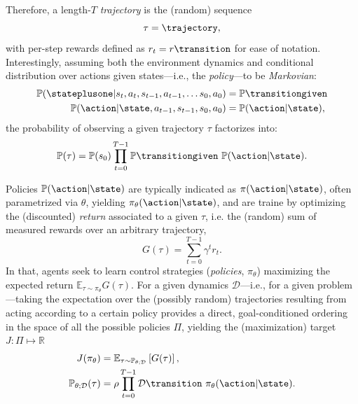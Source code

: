 Therefore, a length-\(T\) \emph{trajectory} is the (random) sequence
\begin{equation}\label{eq:trajectory_definition}
    \tau = \trajectory,
\end{equation}
with per-step rewards defined as \(r_t = r \transition \) for ease of notation.
Interestingly, assuming both the environment dynamics and conditional distribution over actions given states---i.e., the \emph{policy}---to be \emph{Markovian}:
%
\begin{align}
\mathbb P(\stateplusone \vert s_t, a_t, s_{t-1}, a_{t-1}, \dots s_0, a_0 ) &= \mathbb P \transitiongiven \label{eq:dynamics_markovian} \\
\mathbb P(\action \vert \state, a_{t-1}, s_{t-1}, s_0, a_0) &= \mathbb P(\action \vert \state), \label{eq:policy_markovian}
\end{align}
%
the probability of observing a given trajectory \( \tau \) factorizes into:
\begin{equation}\label{eq:traj_prob}
    \mathbb P(\tau) = \mathbb P (s_0) \prod_{t=0}^{T-1} \mathbb P \transitiongiven \ \mathbb P(\action \vert \state).
\end{equation}

Policies \( \mathbb P(\action \vert \state) \) are typically indicated as \( \pi(\action \vert \state) \), often parametrized via \( \theta \), yielding \( \pi_\theta (\action \vert \state )\), and are traine by optimizing the (discounted) \emph{return} associated to a given \( \tau \), i.e. the (random) sum of measured rewards over an arbitrary trajectory, 
\[
    G(\tau) = \sum_{t=0}^{T-1} \gamma^{t} r_t.
\]
In that, agents seek to learn control strategies (\emph{policies}, \( \pi_\theta \)) maximizing the expected return \( \mathbb E_{\tau \sim \pi_\theta} G(\tau) \). 
For a given dynamics \( \mathcal D \)---i.e., for a given problem---taking the expectation over the (possibly random) trajectories resulting from acting according to a certain policy provides a direct, goal-conditioned ordering in the space of all the possible policies \( \Pi \), yielding the (maximization) target \( J : \Pi \mapsto \mathbb R \)
\begin{align}
    J(\pi_\theta) &= \mathbb E_{\tau \sim \mathbb P_{\theta; \mathcal D}} \left[ G(\tau) \right], \label{eq:RL-j-function} \\
    \mathbb P_{\theta; \mathcal D} (\tau) &= \rho \prod_{t=0}^{T-1} \mathcal D \transition \ \pi_\theta (\action \vert \state).\label{eq:traj-probabilities-for-policies}
\end{align}

